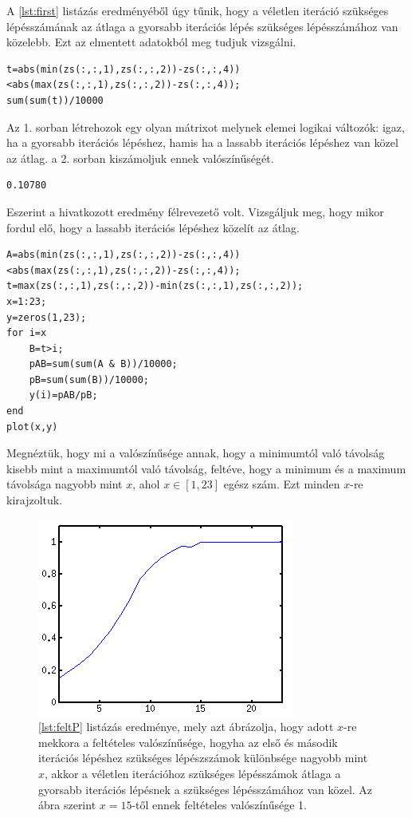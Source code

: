 \documentclass[a4paper,12pt]{report}
\begin{document}
				A \ref{lst:first} listázás eredményéből úgy tűnik, hogy a véletlen iteráció szükséges lépésszámának az átlaga a gyorsabb iterációs lépés szükséges lépésszámához van közelebb. Ezt az elmentett adatokból meg tudjuk vizsgálni.
				\begin{lstlisting}[caption=Bemenet]
t=abs(min(zs(:,:,1),zs(:,:,2))-zs(:,:,4))<abs(max(zs(:,:,1),zs(:,:,2))-zs(:,:,4));
sum(sum(t))/10000
				\end{lstlisting}
				Az 1. sorban létrehozok egy olyan mátrixot melynek elemei logikai változók: igaz, ha a gyorsabb iterációs lépéshez, hamis ha a lassabb iterációs lépéshez van közel az átlag. a 2. sorban kiszámoljuk ennek valószínűségét.
				\begin{lstlisting}[caption=Eredm\'eny]
0.10780
				\end{lstlisting}
				Eszerint a hivatkozott eredmény félrevezető volt. Vizsgáljuk meg, hogy mikor fordul elő, hogy a lassabb iterációs lépéshez közelít az átlag.
		        \begin{lstlisting}[caption=Bemenet,label=lst:feltP]		
A=abs(min(zs(:,:,1),zs(:,:,2))-zs(:,:,4))<abs(max(zs(:,:,1),zs(:,:,2))-zs(:,:,4));
t=max(zs(:,:,1),zs(:,:,2))-min(zs(:,:,1),zs(:,:,2));
x=1:23;
y=zeros(1,23);
for i=x
    B=t>i;
    pAB=sum(sum(A & B))/10000;
    pB=sum(sum(B))/10000;
    y(i)=pAB/pB;
end
plot(x,y)
                \end{lstlisting}
                Megnéztük, hogy mi a valószínűsége annak, hogy a minimumtól való távolság kisebb mint a maximumtól való távolság, feltéve, hogy a minimum és a maximum távolsága nagyobb mint $x$, ahol $x\in [1,23]$ egész szám. Ezt minden $x$-re kirajzoltuk.
                
                \begin{figure}[ht]
					\centering
					\includegraphics[scale=0.7]{feltP.png}
					\caption{\ref{lst:feltP} listázás eredménye, mely azt ábrázolja, hogy adott $x$-re mekkora a feltételes valószínűsége, hogyha az első és második iterációs lépéshez szükséges lépészszámok különbsége nagyobb mint $x$, akkor a véletlen iterációhoz szükséges lépésszámok átlaga a gyorsabb iterációs lépésnek a szükséges lépésszámához van közel. Az ábra szerint $x=15$-től ennek feltételes valószínűsége 1.}
				\end{figure}
				
\end{document}
